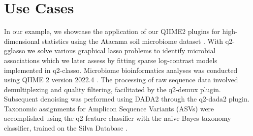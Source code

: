 \documentclass[10pt,a4paper]{article}
\let\cite\citep
\begin{document}




\newpage
\section*{Use Cases} %

In our example, we showcase the application of our QIIME2 plugins for high-dimensional statistics using the Atacama soil microbiome dataset \cite{neilson2017significant}. With q2-gglasso we solve various graphical lasso problems to identify microbial associations which we later assess by fitting sparse log-contrast models implemented in q2-classo. Microbiome bioinformatics analyses was conducted using QIIME 2 version 2022.4 \cite{bolyen2019reproducible}. The processing of raw sequence data involved demultiplexing and quality filtering, facilitated by the q2‐demux plugin. Subsequent denoising was performed using DADA2 \cite{callahan2016dada2} through the q2‐dada2 plugin. Taxonomic assignments for Amplicon Sequence Variants (ASVs) were accomplished using the q2‐feature‐classifier \cite{bokulich2018optimizing} with the naive Bayes taxonomy classifier, trained on the Silva Database \cite{quast2012silva}.
\end{document}
